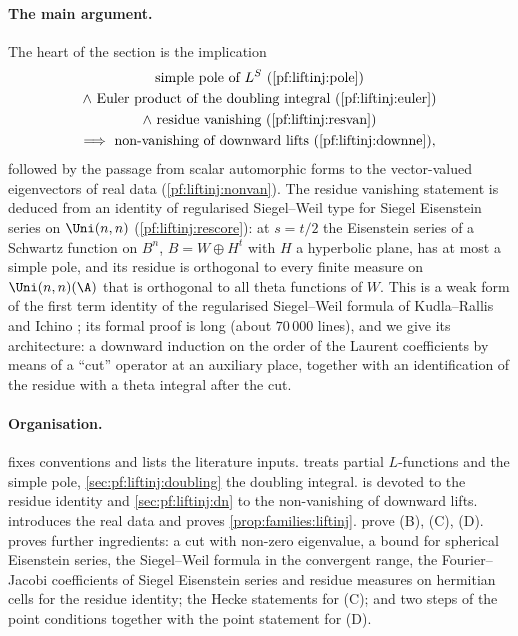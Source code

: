 \paragraph{The main argument.}
The heart of the section is the implication
\[
\begin{gathered}
\text{simple pole of }L^S\ (\cref{pf:liftinj:pole})\\
\wedge\ \text{Euler product of the doubling integral}\ (\cref{pf:liftinj:euler})\\
\wedge\ \text{residue vanishing}\ (\cref{pf:liftinj:resvan})\\
\Longrightarrow\ \text{non-vanishing of downward lifts}\ (\cref{pf:liftinj:downne}),
\end{gathered}
\]
followed by the passage from scalar automorphic forms to the vector-valued eigenvectors of real data
(\cref{pf:liftinj:nonvan}). The residue vanishing statement is deduced from an identity of regularised Siegel--Weil
type for Siegel Eisenstein series on $\Uni(n,n)$ (\cref{pf:liftinj:rescore}): at $s=t/2$ the Eisenstein series of a
Schwartz function on $B^n$, $B=W\oplus H^t$ with $H$ a hyperbolic plane, has at most a simple pole, and its residue is
orthogonal to every finite measure on $\Uni(n,n)(\A)$ that is orthogonal to all theta functions of $W$. This is a weak form
of the first term identity of the regularised Siegel--Weil formula of Kudla--Rallis and Ichino
\cite{KudlaRallis1994,Ichino2004}; its formal proof is long (about $70\,000$ lines), and we give its architecture: a
downward induction on the order of the Laurent coefficients by means of a ``cut'' operator at an auxiliary place, together
with an identification of the residue with a theta integral after the cut.

\paragraph{Organisation.}
 fixes conventions and lists the literature inputs.
 treats partial $L$-functions and the simple pole, \cref{sec:pf:liftinj:doubling} the
doubling integral.  is devoted to the residue identity and \cref{sec:pf:liftinj:dn} to
the non-vanishing of downward lifts.  introduces the real data and proves
\cref{prop:families:liftinj}.  prove (B), (C), (D).  proves
further ingredients: a cut with non-zero eigenvalue, a bound for spherical Eisenstein series, the Siegel--Weil formula in the convergent range, the
Fourier--Jacobi coefficients of Siegel Eisenstein series and residue measures on hermitian cells for the residue identity; the Hecke statements for (C);
and two steps of the point conditions together with the point statement for (D).


